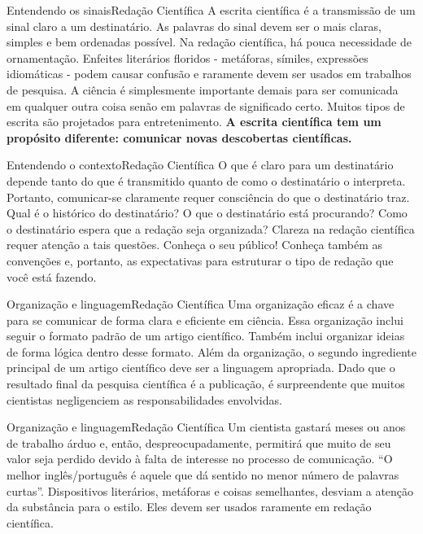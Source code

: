 \documentclass[t]{beamer}
\begin{document}

\begin{ftst}{Entendendo os sinais}{Redação Científica}
\justifying
A escrita científica é a transmissão de um sinal claro a um destinatário. As palavras do sinal devem ser o mais claras, simples e bem ordenadas possível.
\vone
Na redação científica, há pouca necessidade de ornamentação. Enfeites literários floridos - metáforas, símiles, expressões idiomáticas - podem causar confusão e raramente devem ser usados em trabalhos de pesquisa.
\vone
A ciência é simplesmente importante demais para ser comunicada em qualquer outra coisa senão em palavras de significado certo. 
\vone
Muitos tipos de escrita são projetados para entretenimento. \textbf{A escrita científica tem um propósito diferente: comunicar novas descobertas científicas.}



\end{ftst}


\begin{ftst}{Entendendo o contexto}{Redação Científica}
\justifying
O que é claro para um destinatário depende tanto do que é transmitido quanto de como o destinatário o interpreta.
\vone
Portanto, comunicar-se claramente requer consciência do que o destinatário traz. Qual é o histórico do destinatário? O que o destinatário está procurando? Como o destinatário espera que a redação seja organizada? Clareza na redação científica requer atenção a tais questões.
\vone
Conheça o seu público! Conheça também as convenções e, portanto, as expectativas para estruturar o tipo de redação que você está fazendo.



\end{ftst}


\begin{ftst}{Organização e linguagem}{Redação Científica}
\justifying
Uma organização eficaz é a chave para se comunicar de forma clara e eficiente em ciência. 
\vone
Essa organização inclui seguir o formato padrão de um artigo científico. Também inclui organizar ideias de forma lógica dentro desse formato. 
\vone
Além da organização, o segundo ingrediente principal de um artigo científico deve ser a linguagem apropriada.
\vone
Dado que o resultado final da pesquisa científica é a publicação, é surpreendente que muitos cientistas negligenciem as responsabilidades envolvidas. 

\end{ftst}


\begin{ftst}{Organização e linguagem}{Redação Científica}
\justifying
Um cientista gastará meses ou anos de trabalho árduo e, então, despreocupadamente, permitirá que muito de seu valor seja perdido devido à falta de interesse no processo de comunicação.
\vone
“O melhor inglês/português é aquele que dá sentido no menor número de palavras curtas”.
\vone
Dispositivos literários, metáforas e coisas semelhantes, desviam a atenção da substância para o estilo. Eles devem ser usados raramente em redação científica.

\end{ftst}
\end{document}
